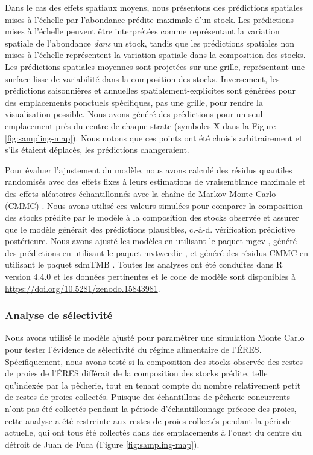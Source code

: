 Dans le cas des effets spatiaux moyens, nous présentons des prédictions spatiales mises à l'échelle par l'abondance prédite maximale d'un stock. Les prédictions mises à l'échelle peuvent être interprétées comme représentant la variation spatiale de l'abondance \textit{dans} un stock, tandis que les prédictions spatiales non mises à l'échelle représentent la variation spatiale dans la composition des stocks. Les prédictions spatiales moyennes sont projetées sur une grille, représentant une surface lisse de variabilité dans la composition des stocks. Inversement, les prédictions saisonnières et annuelles spatialement-explicites sont générées pour des emplacements ponctuels spécifiques, pas une grille, pour rendre la visualisation possible. Nous avons généré des prédictions pour un seul emplacement près du centre de chaque strate (symboles X dans la Figure \ref{fig:sampling-map}). Nous notons que ces points ont été choisis arbitrairement et s'ils étaient déplacés, les prédictions changeraient.

Pour évaluer l'ajustement du modèle, nous avons calculé des résidus quantiles randomisés avec des effets fixes à leurs estimations de vraisemblance maximale et des effets aléatoires échantillonnés avec la chaîne de Markov Monte Carlo (CMMC) \citep[\textit{sensu}][]{rufenerBridgingGapCommercial2021}. Nous avons utilisé ces valeurs simulées pour comparer la composition des stocks prédite par le modèle à la composition des stocks observée et assurer que le modèle générait des prédictions plausibles, c.-à-d. vérification prédictive postérieure. Nous avons ajusté les modèles en utilisant le paquet mgcv \citep{woodFastStableRestricted2011}, généré des prédictions en utilisant le paquet mvtweedie \citep{thorsonDietAnalysisUsing2022, thorsonMultivariateTweedieSelfweightingLikelihood2023}, et généré des résidus CMMC en utilisant le paquet sdmTMB \citep{andersonSdmTMBPackageFast2022}. Toutes les analyses ont été conduites dans R version 4.4.0 \citep{rcoreteamLanguageEnvironmentStatistical2021} et les données pertinentes et le code de modèle sont disponibles à \url{https://doi.org/10.5281/zenodo.15843981}.

\subsubsection{Analyse de sélectivité}

Nous avons utilisé le modèle ajusté pour paramétrer une simulation Monte Carlo pour tester l'évidence de sélectivité du régime alimentaire de l'ÉRES. Spécifiquement, nous avons testé si la composition des stocks observée des restes de proies de l'ÉRES différait de la composition des stocks prédite, telle qu'indexée par la pêcherie, tout en tenant compte du nombre relativement petit de restes de proies collectés. Puisque des échantillons de pêcherie concurrents n'ont pas été collectés pendant la période d'échantillonnage précoce des proies, cette analyse a été restreinte aux restes de proies collectés pendant la période actuelle, qui ont tous été collectés dans des emplacements à l'ouest du centre du détroit de Juan de Fuca (Figure \ref{fig:sampling-map}).

